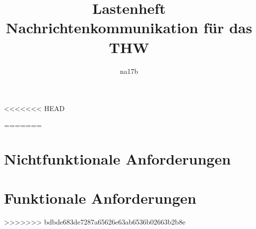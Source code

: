 \documentclass[a4paper,11pt,oneside, titlepage]{article}
\title{Lastenheft\\Nachrichtenkommunikation für das THW}
\author{na17b}
\date{}
\begin{document}
\maketitle


\tableofcontents


\newpage

<<<<<<< HEAD




=======







\newpage
\section{Nichtfunktionale Anforderungen}



\section{Funktionale Anforderungen}



















\newpage
\glsaddall
\printglossaries
>>>>>>> bdbde683de7287a65626e63ab6536b02663b2b8e
\end{document}
